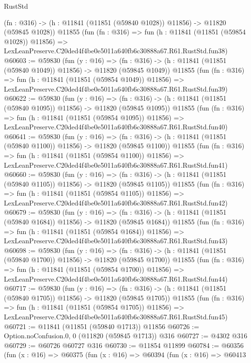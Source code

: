 \begin{lexlean}{RustStd}
\begin{coremodule}
    (fn : @316) -> (h : @11841 (@11851 (@59840 @1028)) @11856) -> @11820 (@59845 @1028))
    @11855
    (fun (fn : @316) =>
    fun (h : @11841 (@11851 (@59854 @1028)) @11856) =>
    LexLeanPreserve.C20ded4f4be0e5011a640fb6c30888a67.R61.RustStd.fun38)
@60603 := @59830
    (fun (y : @16) =>
    (fn : @316) -> (h : @11841 (@11851 (@59840 @1049)) @11856) -> @11820 (@59845 @1049))
    @11855
    (fun (fn : @316) =>
    fun (h : @11841 (@11851 (@59854 @1049)) @11856) =>
    LexLeanPreserve.C20ded4f4be0e5011a640fb6c30888a67.R61.RustStd.fun39)
@60622 := @59830
    (fun (y : @16) =>
    (fn : @316) -> (h : @11841 (@11851 (@59840 @1095)) @11856) -> @11820 (@59845 @1095))
    @11855
    (fun (fn : @316) =>
    fun (h : @11841 (@11851 (@59854 @1095)) @11856) =>
    LexLeanPreserve.C20ded4f4be0e5011a640fb6c30888a67.R61.RustStd.fun40)
@60641 := @59830
    (fun (y : @16) =>
    (fn : @316) -> (h : @11841 (@11851 (@59840 @1100)) @11856) -> @11820 (@59845 @1100))
    @11855
    (fun (fn : @316) =>
    fun (h : @11841 (@11851 (@59854 @1100)) @11856) =>
    LexLeanPreserve.C20ded4f4be0e5011a640fb6c30888a67.R61.RustStd.fun41)
@60660 := @59830
    (fun (y : @16) =>
    (fn : @316) -> (h : @11841 (@11851 (@59840 @1105)) @11856) -> @11820 (@59845 @1105))
    @11855
    (fun (fn : @316) =>
    fun (h : @11841 (@11851 (@59854 @1105)) @11856) =>
    LexLeanPreserve.C20ded4f4be0e5011a640fb6c30888a67.R61.RustStd.fun42)
@60679 := @59830
    (fun (y : @16) =>
    (fn : @316) -> (h : @11841 (@11851 (@59840 @1684)) @11856) -> @11820 (@59845 @1684))
    @11855
    (fun (fn : @316) =>
    fun (h : @11841 (@11851 (@59854 @1684)) @11856) =>
    LexLeanPreserve.C20ded4f4be0e5011a640fb6c30888a67.R61.RustStd.fun43)
@60698 := @59830
    (fun (y : @16) =>
    (fn : @316) -> (h : @11841 (@11851 (@59840 @1700)) @11856) -> @11820 (@59845 @1700))
    @11855
    (fun (fn : @316) =>
    fun (h : @11841 (@11851 (@59854 @1700)) @11856) =>
    LexLeanPreserve.C20ded4f4be0e5011a640fb6c30888a67.R61.RustStd.fun44)
@60717 := @59830
    (fun (y : @16) =>
    (fn : @316) -> (h : @11841 (@11851 (@59840 @1705)) @11856) -> @11820 (@59845 @1705))
    @11855
    (fun (fn : @316) =>
    fun (h : @11841 (@11851 (@59854 @1705)) @11856) =>
    LexLeanPreserve.C20ded4f4be0e5011a640fb6c30888a67.R61.RustStd.fun45)
@60721 := @11841 (@11851 (@59840 @1713)) @11856
@60726 := Option.noConfusion.{0, 0} (@11820 (@59845 @1713)) @316
@60727 := @4302 @316
@60729 := @60726 @60727 @316
@60730 := @11854 @11899
@60784 := @60356
    (fun (x : @16) =>
    @60375
      (fun (x : @16) =>
      @60394
        (fun (x : @16) =>
        @60413

\end{coremodule}
\end{lexlean}

